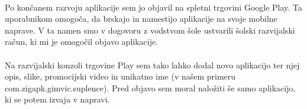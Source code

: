 \paragraph{}Po končanem razvoju aplikacije sem jo objavil na spletni trgovini Google Play. Ta uporabnikom omogoča, da brskajo in namestijo aplikacije na svoje mobilne naprave. V ta namen smo v dogovoru z vodstvom šole ustvarili šolski razvijalski račun, ki mi je omogočil objavo aplikacije.

\paragraph{}Na razvijalski konzoli trgovine Play sem tako lahko dodal novo aplikacijo ter njej opis, slike, promocijski video in unikatno ime (v našem primeru com.zigapk.gimvic.suplence). Pred objavo sem moral naložiti še samo aplikacijo, ki se potem izvaja v napravi.
